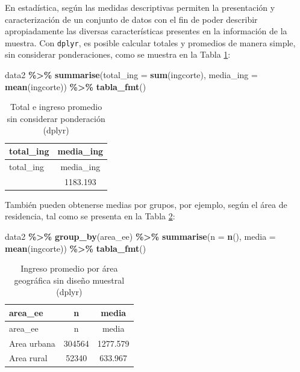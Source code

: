 \documentclass[
  spanish,
  12pt,
]{book}
\newenvironment{Shaded}{\begin{snugshade}}{\end{snugshade}}
\newcommand{\AttributeTok}[1]{\textcolor[rgb]{0.13,0.29,0.53}{#1}}
\newcommand{\FunctionTok}[1]{\textcolor[rgb]{0.13,0.29,0.53}{\textbf{#1}}}
\newcommand{\NormalTok}[1]{#1}
\newcommand{\SpecialCharTok}[1]{\textcolor[rgb]{0.81,0.36,0.00}{\textbf{#1}}}
\begin{document}
En estadística, según \citet{tellez2015estadistica} las medidas descriptivas permiten la presentación y caracterización de un conjunto de datos con el fin de poder describir apropiadamente las diversas características presentes en la información de la muestra.
Con \texttt{dplyr}, es posible calcular totales y promedios de manera simple, sin considerar ponderaciones, como se muestra en la Tabla \ref{tab:tab-total-media-dplyr}:

\begin{Shaded}
\begin{Highlighting}[]
\NormalTok{data2 }\SpecialCharTok{\%\textgreater{}\%}
  \FunctionTok{summarise}\NormalTok{(}\AttributeTok{total\_ing =} \FunctionTok{sum}\NormalTok{(ingcorte),}
            \AttributeTok{media\_ing =} \FunctionTok{mean}\NormalTok{(ingcorte)) }\SpecialCharTok{\%\textgreater{}\%}
  \FunctionTok{tabla\_fmt}\NormalTok{()}
\end{Highlighting}
\end{Shaded}

\begin{longtable}[]{@{}lc@{}}
\caption{\label{tab:tab-total-media-dplyr}Total e ingreso promedio sin considerar ponderación (dplyr)}\tabularnewline
\toprule\noalign{}
total\_ing & media\_ing \\
\midrule\noalign{}
\endfirsthead
\toprule\noalign{}
total\_ing & media\_ing \\
\midrule\noalign{}
\endhead
\bottomrule\noalign{}
\endlastfoot
422286293 & 1183.193 \\
\end{longtable}

También pueden obtenerse medias por grupos, por ejemplo, según el área de residencia, tal como se presenta en la Tabla \ref{tab:tab-media-area-dplyr}:

\begin{Shaded}
\begin{Highlighting}[]
\NormalTok{data2 }\SpecialCharTok{\%\textgreater{}\%}
  \FunctionTok{group\_by}\NormalTok{(area\_ee) }\SpecialCharTok{\%\textgreater{}\%}
  \FunctionTok{summarise}\NormalTok{(}\AttributeTok{n =} \FunctionTok{n}\NormalTok{(),}
            \AttributeTok{media =} \FunctionTok{mean}\NormalTok{(ingcorte)) }\SpecialCharTok{\%\textgreater{}\%}
  \FunctionTok{tabla\_fmt}\NormalTok{()}
\end{Highlighting}
\end{Shaded}

\begin{longtable}[]{@{}lcc@{}}
\caption{\label{tab:tab-media-area-dplyr}Ingreso promedio por área geográfica sin diseño muestral (dplyr)}\tabularnewline
\toprule\noalign{}
area\_ee & n & media \\
\midrule\noalign{}
\endfirsthead
\toprule\noalign{}
area\_ee & n & media \\
\midrule\noalign{}
\endhead
\bottomrule\noalign{}
\endlastfoot
Area urbana & 304564 & 1277.579 \\
Area rural & 52340 & 633.967 \\
\end{longtable}
\end{document}
